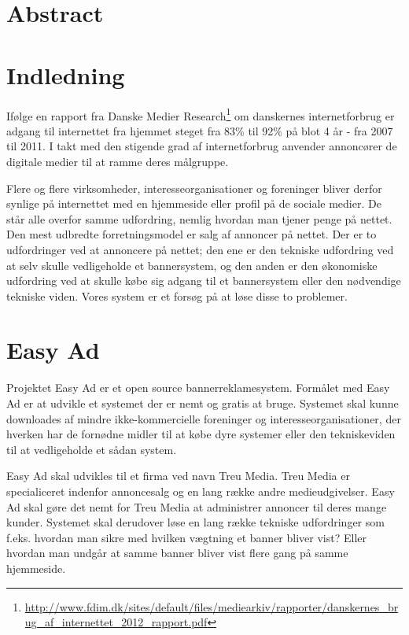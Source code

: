 \documentclass[a4paper,12pt]{article}
\begin{document}
\section{Abstract}
\section{Indledning}
Ifølge en rapport fra Danske Medier Research\footnote{\url{ http://www.fdim.dk/sites/default/files/mediearkiv/rapporter/danskernes\_brug\_af\_internettet\_2012\_rapport.pdf}} om danskernes internetforbrug er adgang til internettet fra hjemmet steget fra 83\% til 92\% på blot 4 år - fra 2007 til 2011. I takt med den stigende grad af internetforbrug anvender annoncører de digitale medier til at ramme deres målgruppe.

Flere og flere virksomheder, interesseorganisationer og foreninger bliver derfor synlige på internettet med en hjemmeside eller profil på de sociale medier. De står alle overfor samme udfordring, nemlig hvordan man tjener penge på nettet. Den mest udbredte forretningsmodel er salg af annoncer på nettet. Der er to udfordringer ved at annoncere på nettet; den ene er den tekniske udfordring ved at selv skulle vedligeholde et bannersystem, og den anden er den økonomiske udfordring ved at skulle købe sig adgang til et bannersystem eller den nødvendige tekniske viden. Vores system er et forsøg på at løse disse to problemer.

\section{Easy Ad}

Projektet Easy Ad er et open source bannerreklamesystem. Formålet med Easy Ad er at udvikle et systemet der er nemt og gratis at bruge. Systemet skal kunne downloades af mindre ikke-kommercielle foreninger og interesseorganisationer, der hverken har de fornødne midler til at købe dyre systemer eller den tekniskeviden til at vedligeholde et sådan system.

Easy Ad skal udvikles til et firma ved navn Treu Media. Treu Media er specialiceret indenfor annoncesalg og en lang række andre medieudgivelser. Easy Ad skal gøre det nemt for Treu Media at administrer annoncer til deres mange kunder. Systemet skal derudover løse en lang række tekniske udfordringer som f.eks. hvordan man sikre med hvilken vægtning et banner bliver vist? Eller hvordan man undgår at samme banner bliver vist flere gang på samme hjemmeside.
\end{document}
